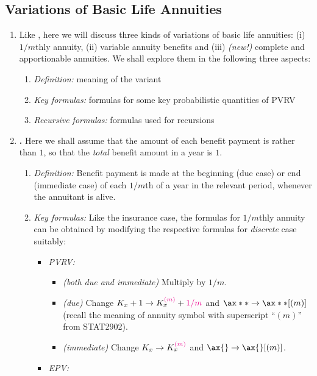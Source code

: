 \subsection{Variations of Basic Life Annuities}
\label{subsect:variations-annuity}
\begin{enumerate}
\item Like , here we will discuss three kinds of
variations of basic life annuities: (i) \(1/m\)thly annuity, (ii) variable
annuity benefits and (iii) \emph{(new!)} complete and apportionable annuities.
We shall explore them in the following three aspects:
\begin{enumerate}[label={(\arabic*)}]
\item \emph{Definition:} meaning of the variant
\item \emph{Key formulas:} formulas for some key probabilistic quantities of PVRV
\item \emph{Recursive formulas:} formulas used for recursions
\end{enumerate}
\item \textbf{.} \warn{} Here we shall assume that
the amount of each benefit payment is  rather than \(1\), so that
the \emph{total} benefit amount in a year is \(1\).
\begin{enumerate}[label={(\arabic*)}]
\item \emph{Definition:} Benefit payment is made at the beginning (due case) or
end (immediate case) of each \(1/m\)th of a year in the relevant period,
whenever the annuitant is alive.
\item \emph{Key formulas:} Like the insurance case, the formulas for
\(1/m\)thly annuity can be obtained by modifying the respective formulas for
\emph{discrete} case suitably:
\begin{itemize}
\item \emph{PVRV:} 
\begin{itemize}
\item \emph{(both due and immediate)} Multiply by \(1/m\).
\item \emph{(due)} Change \(K_x+1\to K_x^{{\color{magenta}(m)}}+{\color{magenta}1/m}\) and
\(\ax**{}\to \ax**{}[(m)]\) (recall the meaning of annuity symbol with
superscript ``\((m)\)'' from STAT2902).
\item \emph{(immediate)} Change \(K_x\to K_x^{{\color{magenta}(m)}}\) and \(\ax{}\to\ax{}[(m)]\).
\end{itemize}
\item \emph{EPV:}
\begin{itemize}

\end{itemize}
\end{itemize}
\end{enumerate}
\end{enumerate}
